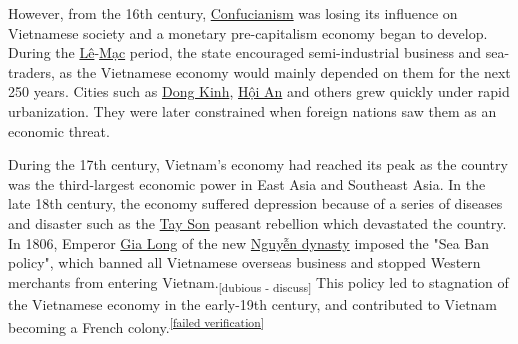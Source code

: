 \documentclass[openany]{book}
\begin{document}
\begin{sloppypar}\RaggedRight
However, from the 16th century, \href{https://en.wikipedia.org/wiki/Confucianism}{Confucianism} was losing its influence on Vietnamese society and a monetary pre-capitalism economy began to develop. During the \href{https://en.wikipedia.org/wiki/L%C3%AA_dynasty}{Lê}-\href{https://en.wikipedia.org/wiki/M%E1%BA%A1c_dynasty}{Mạc} period, the state encouraged semi-industrial business and sea-traders, as the Vietnamese economy would mainly depended on them for the next 250 years.\cite{31} Cities such as \href{https://en.wikipedia.org/wiki/Dong_Kinh}{Dong Kinh}, \href{https://en.wikipedia.org/wiki/H%E1%BB%99i_An}{Hội An} and others grew quickly under rapid urbanization. They were later constrained when foreign nations saw them as an economic threat.\cite{32}\cite{33}
\end{sloppypar}
\begin{sloppypar}\RaggedRight
During the 17th century, Vietnam's economy had reached its peak as the country was the third-largest economic power in East Asia and Southeast Asia. In the late 18th century, the economy suffered depression because of a series of diseases and disaster such as the \href{https://en.wikipedia.org/wiki/Tay_Son}{Tay Son} peasant rebellion which devastated the country. In 1806, Emperor \href{https://en.wikipedia.org/wiki/Gia_Long}{Gia Long} of the new \href{https://en.wikipedia.org/wiki/Nguy%E1%BB%85n_dynasty}{Nguyễn dynasty} imposed the "Sea Ban policy", which banned all Vietnamese overseas business and stopped Western merchants from entering Vietnam.\textsubscript{[dubious - discuss]} This policy led to stagnation of the Vietnamese economy in the early-19th century, and contributed to Vietnam becoming a French colony.\cite{34}\textsuperscript{\href{https://en.wikipedia.org/wiki/Wikipedia:Verifiability}{\tiny [failed verification]}}\cite{35}
\end{sloppypar}
\end{document}
